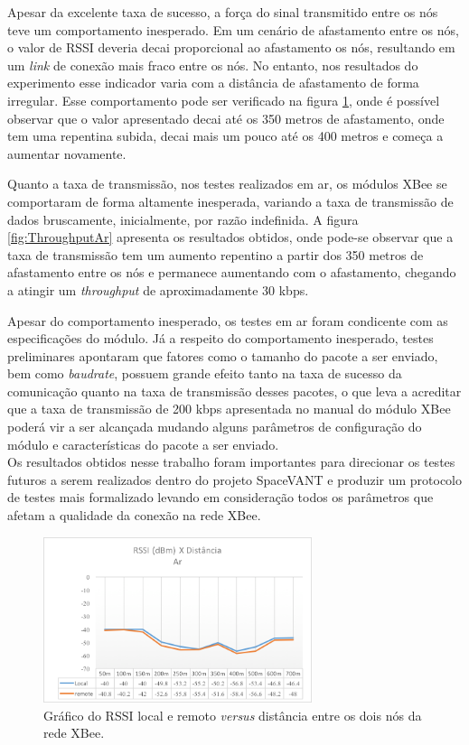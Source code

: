 Apesar da excelente taxa de sucesso, a força do sinal transmitido entre os nós teve um comportamento inesperado. Em um cenário de afastamento entre os nós, o valor de RSSI deveria decai proporcional ao afastamento os nós, resultando em um \emph{link} de conexão mais fraco entre os nós. No entanto, nos resultados do experimento esse indicador varia com a distância de afastamento de forma irregular. Esse comportamento pode ser verificado na figura \ref{fig:RangeChao}, onde é possível observar que o valor apresentado decai até os 350 metros de afastamento, onde tem uma repentina subida, decai mais um pouco até os 400 metros e começa a aumentar novamente. 

Quanto a taxa de transmissão, nos testes realizados em ar, os módulos XBee se comportaram de forma altamente inesperada, variando a taxa de transmissão de dados bruscamente, inicialmente, por razão indefinida. A figura \ref{fig:ThroughputAr} apresenta os resultados obtidos, onde pode-se observar que a taxa de transmissão tem um aumento repentino a partir dos 350 metros de afastamento entre os nós e permanece aumentando com o afastamento, chegando a atingir um \emph{throughput} de aproximadamente 30 kbps.

Apesar do comportamento inesperado, os testes em ar foram condicente com as especificações do módulo. Já a respeito do comportamento inesperado, testes preliminares apontaram que fatores como o tamanho do pacote a ser enviado, bem como \emph{baudrate}, possuem grande efeito tanto na taxa de sucesso da comunicação quanto na taxa de transmissão desses pacotes, o que leva a acreditar que a taxa de transmissão de 200 kbps apresentada no manual do módulo XBee poderá vir a ser alcançada mudando alguns parâmetros de configuração do módulo e características do pacote a ser enviado.\\

Os resultados obtidos nesse trabalho foram importantes para direcionar os testes futuros a serem realizados dentro do projeto SpaceVANT e produzir um protocolo de testes mais formalizado levando em consideração todos os parâmetros que afetam a qualidade da conexão na rede XBee.   

\begin{figure} 
\center
\includegraphics[width=0.7\textwidth]{rangeResultAr.png}
\caption{Gráfico do RSSI local e remoto \emph{versus} distância entre os dois nós da rede XBee.} 
\label{fig:RangeChao}
\end{figure}

